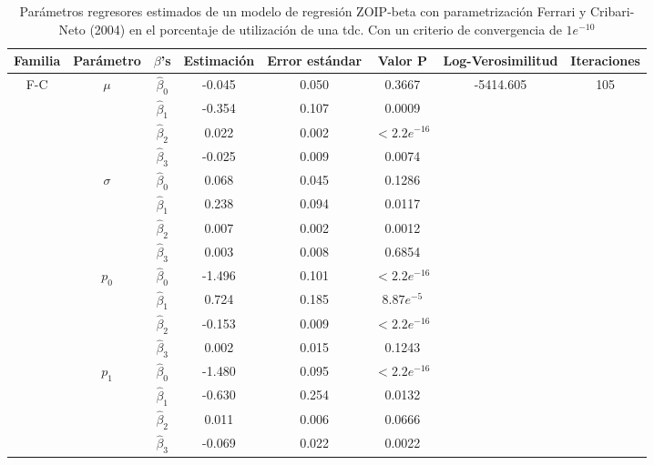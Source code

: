 \begin{table}[!hbt]
{\scriptsize
\begin{center}
\begin{tabular}{|c|c|c|ccc|c|c|}\hline
Familia & Par\'{a}metro & $\beta$'s & Estimaci\'{o}n & Error est\'{a}ndar & Valor P & Log-Verosimilitud & Iteraciones \\ \hline \hline
\multirow{12}{*}{F-C} & \multirow{4}{*}{$\mu$} & $\hat{\beta}_0$ & -0.045	&0.050	&0.3667  & \multirow{12}{*}{-5414.605} & \multirow{12}{*}{105} \\
& & $\hat{\beta}_1$ & -0.354	&0.107	&0.0009   & &\\
& & $\hat{\beta}_2$ & 0.022	&0.002	&$<2.2e^{-16}$   & &\\
& & $\hat{\beta}_3$ & -0.025	&0.009	&0.0074   & &\\ \cline{2-6}
& \multirow{4}{*}{$\sigma$} & $\hat{\beta}_0$ & 0.068	&0.045	&0.1286   & &\\
& & $\hat{\beta}_1$ & 0.238	&0.094	&0.0117   & &\\
& & $\hat{\beta}_2$ & 0.007	&0.002	&0.0012   & &\\
& & $\hat{\beta}_3$ & 0.003	&0.008	&0.6854   & &\\ \cline{2-6}
& \multirow{4}{*}{$p_0$} & $\hat{\beta}_0$ & -1.496	&0.101	&$<2.2e^{-16}$  & &\\
& & $\hat{\beta}_1$ & 0.724	&0.185	&$8.87e^{-5}$  & &\\
& & $\hat{\beta}_2$ & -0.153	&0.009	&$<2.2e^{-16}$  & &\\
& & $\hat{\beta}_3$ & 0.002	&0.015	&0.1243  & &\\ \cline{2-6}
& \multirow{4}{*}{$p_1$} & $\hat{\beta}_0$ &-1.480	&0.095	&$<2.2e^{-16}$  & &\\
& & $\hat{\beta}_1$ & -0.630	&0.254	&0.0132  & &\\
& & $\hat{\beta}_2$ & 0.011	&0.006	&0.0666  & &\\
& & $\hat{\beta}_3$ & -0.069	&0.022	&0.0022  & &\\ \hline

\end{tabular}
\caption{Par\'{a}metros regresores estimados de un modelo de regresi\'{o}n ZOIP-beta con parametrizaci\'{o}n Ferrari y Cribari-Neto (2004) en el porcentaje de utilizaci\'{o}n de una tdc. Con un criterio de convergencia de $1e^{-10}$}
\label{T_Apli_CC_FC}
\end{center}
}
\end{table}


